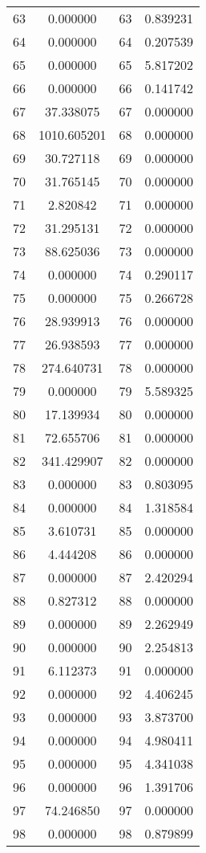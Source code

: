 \documentclass[12pt]{article}
\begin{document}
\begin{longtable}{@{}cccc@{}}
63 & 0.000000 & 63 & 0.839231 \\
64 & 0.000000 & 64 & 0.207539 \\
65 & 0.000000 & 65 & 5.817202 \\
66 & 0.000000 & 66 & 0.141742 \\
67 & 37.338075 & 67 & 0.000000 \\
68 & 1010.605201 & 68 & 0.000000 \\
69 & 30.727118 & 69 & 0.000000 \\
70 & 31.765145 & 70 & 0.000000 \\
71 & 2.820842 & 71 & 0.000000 \\
72 & 31.295131 & 72 & 0.000000 \\
73 & 88.625036 & 73 & 0.000000 \\
74 & 0.000000 & 74 & 0.290117 \\
75 & 0.000000 & 75 & 0.266728 \\
76 & 28.939913 & 76 & 0.000000 \\
77 & 26.938593 & 77 & 0.000000 \\
78 & 274.640731 & 78 & 0.000000 \\
79 & 0.000000 & 79 & 5.589325 \\
80 & 17.139934 & 80 & 0.000000 \\
81 & 72.655706 & 81 & 0.000000 \\
82 & 341.429907 & 82 & 0.000000 \\
83 & 0.000000 & 83 & 0.803095 \\
84 & 0.000000 & 84 & 1.318584 \\
85 & 3.610731 & 85 & 0.000000 \\
86 & 4.444208 & 86 & 0.000000 \\
87 & 0.000000 & 87 & 2.420294 \\
88 & 0.827312 & 88 & 0.000000 \\
89 & 0.000000 & 89 & 2.262949 \\
90 & 0.000000 & 90 & 2.254813 \\
91 & 6.112373 & 91 & 0.000000 \\
92 & 0.000000 & 92 & 4.406245 \\
93 & 0.000000 & 93 & 3.873700 \\
94 & 0.000000 & 94 & 4.980411 \\
95 & 0.000000 & 95 & 4.341038 \\
96 & 0.000000 & 96 & 1.391706 \\
97 & 74.246850 & 97 & 0.000000 \\
98 & 0.000000 & 98 & 0.879899 \\

\end{longtable}
\end{document}
